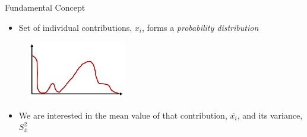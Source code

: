 \documentclass[xcolor=x11names,compress]{beamer}
\renewcommand{\(}{\begin{columns}}
\renewcommand{\)}{\end{columns}}
\newcommand{\<}[1]{\begin{column}{#1}}
\renewcommand{\>}{\end{column}}
\begin{document}
\begin{frame}{Fundamental Concept}

\begin{itemize}
  \item Set of individual contributions, ${x_i}$,
forms a \textit{probability distribution}
\end{itemize}
  	\begin{figure}
  	\begin{center}
  		\includegraphics[height=1in,clip]{../figs/pdf}
	\end{center}
  	\end{figure}

\begin{itemize}
  \item We are interested in the mean value of that contribution, $\overline{x_i}$, and its variance, $S_{\overline{x}}^2$
\end{itemize}

\end{frame}


%
\end{document}
